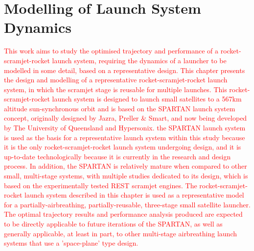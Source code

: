 
\cleardoublepage
\chapter{Modelling of Launch System Dynamics}\label{chapter:Design}


\textcolor{red}{This work aims to study the optimised trajectory and performance of a rocket-scramjet-rocket launch system, requiring the dynamics of a launcher to be modelled in some detail, based on a representative design.
	This chapter presents the design and modelling of a representative rocket-scramjet-rocket launch system, in which the scramjet stage is reusable for multiple launches. 
		This rocket-scramjet-rocket launch system is designed to launch small satellites to a 567km altitude sun-synchronous orbit and is based on the SPARTAN launch system concept, originally designed by Jazra, Preller \& Smart\cite{Preller2017b,Jazra2013}, and now being developed by The University of Queensland and Hypersonix.
		the SPARTAN launch system is used as the basis for a representative launch system within this study because it is the only rocket-scramjet-rocket launch system undergoing design, 
		 and it is up-to-date technologically because it is currently in the research and design process. In addition, the SPARTAN is relatively mature when compared to other small, multi-stage systems, with multiple studies dedicated to its design, which is based on the experimentally tested REST scramjet engines.   
	The rocket-scramjet-rocket launch system described in this chapter is used as a representative model for a partially-airbreathing, partially-reusable, three-stage small satellite launcher. The optimal trajectory results and performance analysis produced are expected to be directly applicable to future iterations of the SPARTAN, as well as generally applicable, at least in part, to other multi-stage airbreathing launch systems that use a 'space-plane' type design. }
	
